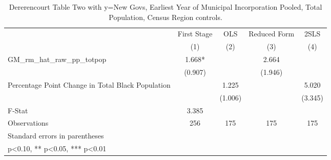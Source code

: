 \begin{table}[htbp]\centering
\def\sym#1{\ifmmode^{#1}\else\(^{#1}\)\fi}
\caption{Dererencourt Table Two with y=New Govs, Earliest Year of Municipal Incorporation  Pooled, Total Population, Census Region controls.}
\begin{tabular}{l*{4}{c}}
\toprule
                    & First Stage   &         OLS   &Reduced Form   &        2SLS   \\
                    &\multicolumn{1}{c}{(1)}   &\multicolumn{1}{c}{(2)}   &\multicolumn{1}{c}{(3)}   &\multicolumn{1}{c}{(4)}   \\
\midrule
GM\_rm\_hat\_raw\_pp\_totpop&       1.668*  &               &       2.664   &               \\
                    &     (0.907)   &               &     (1.946)   &               \\
\addlinespace
Percentage Point Change in Total Black Population&               &       1.225   &               &       5.020   \\
                    &               &     (1.006)   &               &     (3.345)   \\
\midrule
F-Stat              &       3.385   &               &               &               \\
Observations        &         256   &         175   &         175   &         175   \\
\bottomrule
\multicolumn{5}{l}{\footnotesize Standard errors in parentheses}\\
\multicolumn{5}{l}{\footnotesize * p<0.10, ** p<0.05, *** p<0.01}\\
\end{tabular}
\end{table}
